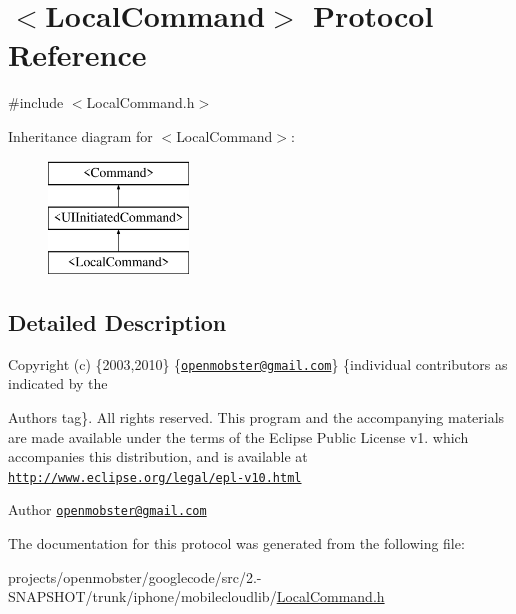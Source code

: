 \hypertarget{protocol_local_command-p}{
\section{$<$\-Local\-Command$>$ \-Protocol \-Reference}
\label{protocol_local_command-p}
}


{\ttfamily \#include $<$\-Local\-Command.\-h$>$}

\-Inheritance diagram for $<$\-Local\-Command$>$\-:\begin{figure}[H]
\begin{center}
\leavevmode
\includegraphics[height=3.000000cm]{protocol_local_command-p}
\end{center}
\end{figure}


\subsection{\-Detailed \-Description}
\-Copyright (c) \{2003,2010\} \{\href{mailto:openmobster@gmail.com}{\tt openmobster@gmail.\-com}\} \{individual contributors as indicated by the \begin{DoxyAuthor}{\-Authors}
tag\}. \-All rights reserved. \-This program and the accompanying materials are made available under the terms of the \-Eclipse \-Public \-License v1. which accompanies this distribution, and is available at \href{http://www.eclipse.org/legal/epl-v10.html}{\tt http\-://www.\-eclipse.\-org/legal/epl-\/v10.\-html}
\end{DoxyAuthor}
\begin{DoxyAuthor}{\-Author}
\href{mailto:openmobster@gmail.com}{\tt openmobster@gmail.\-com} 
\end{DoxyAuthor}


\-The documentation for this protocol was generated from the following file\-:\begin{DoxyCompactItemize}
\item 
projects/openmobster/googlecode/src/2.-\/\-S\-N\-A\-P\-S\-H\-O\-T/trunk/iphone/mobilecloudlib/\hyperlink{_local_command_8h}{\-Local\-Command.\-h}\end{DoxyCompactItemize}
